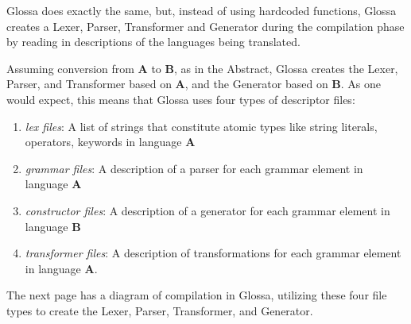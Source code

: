 \documentclass{article}
\begin{document}
Glossa does exactly the same, but, instead of using hardcoded functions, Glossa creates a Lexer, Parser, Transformer and Generator during the compilation phase by reading in descriptions of the languages being translated.

Assuming conversion from \textbf{A} to \textbf{B}, as in the Abstract, Glossa creates the Lexer, Parser, and Transformer based on \textbf{A}, and the Generator based on \textbf{B}.
As one would expect, this means that Glossa uses four types of descriptor files:

\begin{enumerate}
    \item \textit{lex files}: A list of strings that constitute atomic types like string literals, operators, keywords in language \textbf{A} 
    \item \textit{grammar files}: A description of a parser for each grammar element in language \textbf{A} 
    \item \textit{constructor files}: A description of a generator for each grammar element in language \textbf{B}
    \item \textit{transformer files}: A description of transformations for each grammar element in language \textbf{A}.
\end{enumerate}

The next page has a diagram of compilation in Glossa, utilizing these four file types to create the Lexer, Parser, Transformer, and Generator.

\newpage
\end{document}
